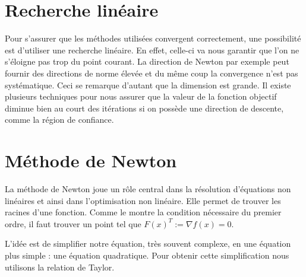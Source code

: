 \section{Recherche lin\'eaire}
Pour s'assurer que les m\'ethodes utilis\'ees convergent correctement, une possibilit\'e est d'utiliser une recherche lin\'eaire. En effet, celle-ci
va nous garantir que l'on ne s'\'eloigne pas trop du point courant. La direction de Newton par exemple peut fournir des directions 
de norme \'elev\'ee et du même coup la convergence n'est pas syst\'ematique. Ceci se remarque d'autant que la dimension est grande.
Il existe plusieurs techniques pour nous assurer que la valeur de la fonction objectif diminue bien au court des it\'erations
si on poss\`ede une direction de descente, comme la r\'egion de confiance.




\section{M\'ethode de Newton}


La m\'ethode de Newton joue un rôle central dans la r\'esolution d'\'equations non lin\'eaires et ainsi dans l'optimisation 
non lin\'eaire. Elle permet de trouver les racines d'une fonction. Comme le montre la condition n\'ecessaire du premier ordre,
il faut trouver un point tel que $F(x)^T:=\nabla f(x)=0$.

 L'id\'ee est de simplifier notre \'equation, tr\`es souvent complexe, en une \'equation plus simple : une \'equation 
quadratique. Pour obtenir cette simplification nous utilisons la relation de Taylor.


% 


